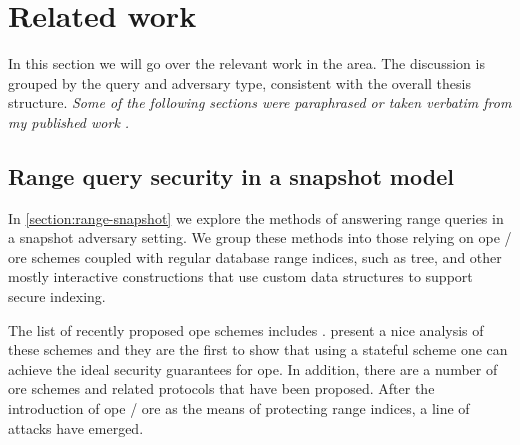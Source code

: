 \chapter{Related work}\label{section:related-work}
\thispagestyle{myheadings}

	In this section we will go over the relevant work in the area.
 	The discussion is grouped by the query and adversary type, consistent with the overall thesis structure.
	\emph{Some of the following sections were paraphrased or taken verbatim from my published work \cite{ore-benchmark-17,epsolute}.}

	\section{Range query security in a snapshot model}

		In \cref{section:range-snapshot} we explore the methods of answering range queries in a snapshot adversary setting.
		We group these methods into those relying on \acrshort{ope} / \acrshort{ore} schemes coupled with regular database range indices, such as \BPlus{} tree, and other mostly interactive constructions that use custom data structures to support secure indexing.

		The list of recently proposed \acrfull{ope} schemes includes \cite{ope-original, anti-tamper-dbs, bclo-ope, ope-leakage, ope-beyond-one-wayness, ope-early-fh-ope, ope-beyond-ideal-object, ope-mv-opes, fh-ope, ope-mv-popes, ope-multi-user, ope-note, ope-for-encrypted-dbs, ope-structure, ope-non-linear, ope-mdope, ope-outsourced-database, fh-ope-imporved-update}. %
		\textcite{ope-ideal-security-protocol} present a nice analysis of these schemes and they are the first to show that using a stateful scheme one can achieve the ideal security guarantees for \acrshort{ope}.
		In addition, there are a number of \acrfull{ore} schemes \cite{ore-original, clww-ore, lewi-wu-ore, parameter-hiding-ore, parameter-hiding-ore, ore-learning, ore-partial, ore-multi-client,  delegatable-ore, multi-client-ore} and related protocols \cite{ore-sorel} that have been proposed. %
		After the introduction of \acrshort{ope} / \acrshort{ore} as the means of protecting range indices, a line of attacks \cite{leakage-abuse-attacks-cash-15,attacks-what-else-revealed,inference-attacks-naveed-15, ore-file-injection-attack} have emerged.

